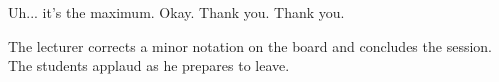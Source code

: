 \begin{spoken-clean}[00:28:12 - 00:28:47]
 Uh... it's the maximum. Okay. Thank you.  Thank you. 
\end{spoken-clean}

\begin{meta-note}
The lecturer corrects a minor notation on the board and concludes the session. The students applaud as he prepares to leave.
\end{meta-note}